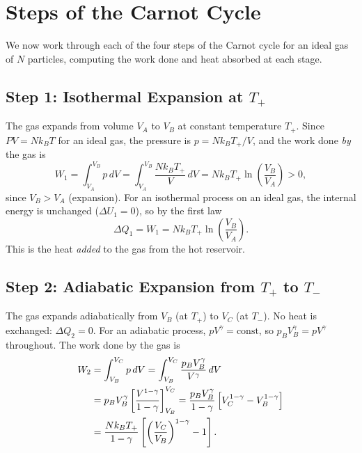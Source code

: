 \section{Steps of the Carnot Cycle}

We now work through each of the four steps of the Carnot cycle for an ideal gas of $N$ particles, computing the work done and heat absorbed at each stage.

\subsection{Step 1: Isothermal Expansion at $T_+$}

The gas expands from volume $V_A$ to $V_B$ at constant temperature $T_+$. Since $PV = Nk_BT$ for an ideal gas, the pressure is $p = Nk_BT_+/V$, and the work done \emph{by} the gas is
\begin{equation}
    W_1 = \int_{V_A}^{V_B} p\,dV = \int_{V_A}^{V_B} \frac{Nk_BT_+}{V}\,dV = Nk_BT_+\ln\!\left(\frac{V_B}{V_A}\right) > 0,
\end{equation}
since $V_B > V_A$ (expansion). For an isothermal process on an ideal gas, the internal energy is unchanged ($\Delta U_1 = 0$), so by the first law
\begin{equation}
    \Delta Q_1 = W_1 = Nk_BT_+\ln\!\left(\frac{V_B}{V_A}\right).
\end{equation}
This is the heat \emph{added} to the gas from the hot reservoir.

\subsection{Step 2: Adiabatic Expansion from $T_+$ to $T_-$}

The gas expands adiabatically from $V_B$ (at $T_+$) to $V_C$ (at $T_-$). No heat is exchanged: $\Delta Q_2 = 0$. For an adiabatic process, $pV^\gamma = \text{const}$, so $p_B V_B^\gamma = p V^\gamma$ throughout. The work done by the gas is
\begin{align}
    W_2 &= \int_{V_B}^{V_C} p\,dV = \int_{V_B}^{V_C} \frac{p_B V_B^\gamma}{V^\gamma}\,dV \notag \\
    &= p_B V_B^\gamma \left[\frac{V^{1-\gamma}}{1-\gamma}\right]_{V_B}^{V_C} = \frac{p_B V_B^\gamma}{1-\gamma}\left[V_C^{1-\gamma} - V_B^{1-\gamma}\right] \notag \\
    &= \frac{Nk_BT_+}{1-\gamma}\left[\left(\frac{V_C}{V_B}\right)^{1-\gamma} - 1\right].
\end{align}

